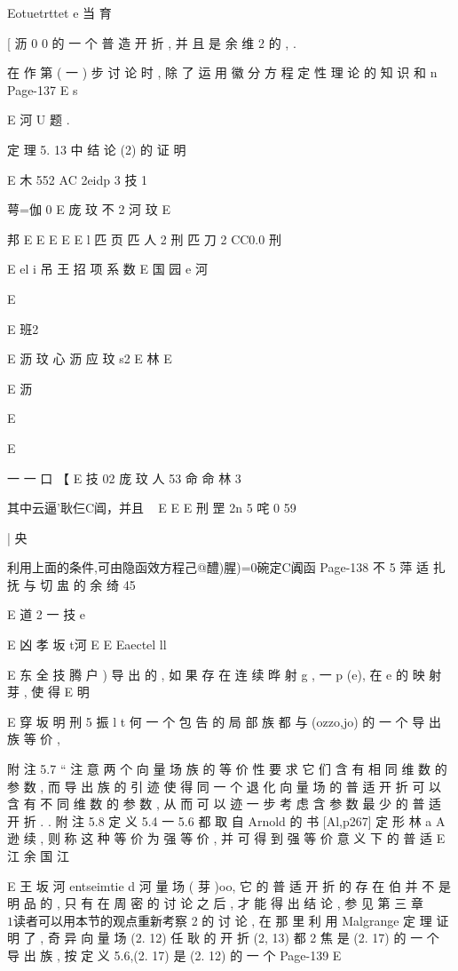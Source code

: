 {{{{Eotuetrttet e 当 育

[ 沥
0 0
的 一 个 普 造 开 折 , 并 且 是 余 维 2 的 , .

在 作 第 ( 一 ) 步 讨 论 时 , 除 了 运 用 徽 分 方 程 定 性 理 论 的 知 识 和
n
Page-137
E s

E 河 U
题 .

定 理 5. 13 中 结 论 (2) 的 证 明

E 木
552 AC 2eidp 3 技 1
{ 萼=伽 0
E 庞 玟 不 2 河 玟
E

邦 E
E E E E
l 匹 页 匹 人 2 刑 匹 刀 2 CC0.0 刑

E el i 吊 王 招
项 系 数
E 国 园 e 河

E

{ E 班2

E 沥 玟 心 沥 应 玟 s2
E
林
E

E 沥

E

E
{ 一 一 口 【
E 技 02 庞 玟 人 53 命 命 林 3

其中云逼'耿仨C阊，并且
~ E E
E 刑 罡
2n 5 咤 0 59

|
央

利用上面的条件,可由隐函效方程己@醴)腥)=0碗定C阗函
Page-138
不 5 萍 适 扎 抚 与 切 盅 的 余 绮 45

E
道 2 一 技 e

E 凶 孝 坂 t河
E
E
Eaectel ll

E 东 全 技 腾
户 ) 导 出 的 , 如 果 存 在 连 续 晔 射 g , 一 p (e), 在 e 的 映 射 芽 , 使 得
E 明

E 穿 坂 明 刑 5 振 l
t
何 一 个 包 告 的 局 部 族 都 与 (ozzo,jo) 的 一 个 导 出 族 等 价 ,

附 注 5.7 “ 注 意 两 个 向 量 场 族 的 等 价 性 要 求 它 们 含 有 相 同 维
数 的 参 数 , 而 导 出 族 的 引 迹 使 得 同 一 个 退 化 向 量 场 的 普 适 开 折 可
以 含 有 不 同 维 数 的 参 数 , 从 而 可 以 迹 一 步 考 虑 含 参 数 最 少 的 普 适
开 折 .
. 附 注 5.8 定 义 5.4 一 5.6 都 取 自 Arnold 的 书 [Al,p267] 定
形 林
a
A 逊 续 , 则 称 这 种 等 价 为 强 等 价 , 并 可 得 到 强 等 价 意 义 下 的 普 适
E 江 余
国 江

E 王 坂 河 entseimtie d 河
量 场 ( 芽 )oo, 它 的 普 适 开 折 的 存 在 伯 并 不 是 明 品 的 , 只 有 在 周 密 的
讨 论 之 后 , 才 能 得 出 结 论 , 参 见 第 三 章 $ 1

读 者 可 以 用 本 节 的 观 点 重 新 考 察 $ 2 的 讨 论 , 在 那 里 利 用
Malgrange 定 理 证 明 了 , 奇 异 向 量 场 (2. 12) 任 耿 的 开 折 (2, 13) 都
2
焦 是 (2. 17) 的 一 个 导 出 族 , 按 定 义 5.6,(2. 17) 是 (2. 12) 的 一 个
Page-139
E

}}}}}}}
